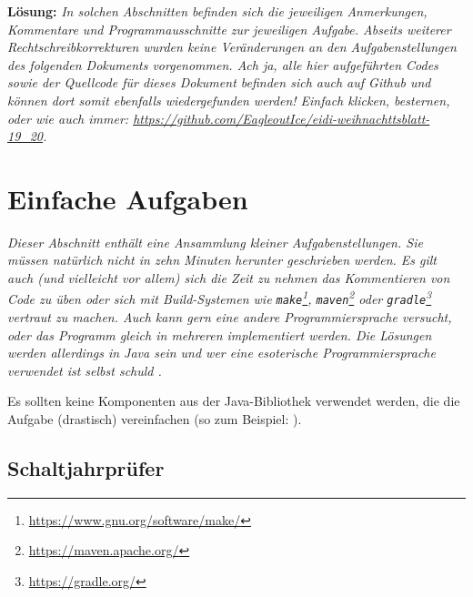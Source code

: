 \documentclass[table]{sopra-base}
\makeatletter
\let\T\texttt
\newenvironment{solution}{\null\par\noindent\textbf{\textcolor{sob@col@uulm@cs}{Lösung:}}\newline\bgroup\color{black}\slshape\ignorespaces}{\egroup}
\makeatother
\begin{document}
\begin{solution}
    In solchen Abschnitten befinden sich die jeweiligen Anmerkungen, Kommentare und Programmausschnitte zur jeweiligen Aufgabe. Abseits weiterer Rechtschreibkorrekturen wurden keine Veränderungen an den Aufgabenstellungen des folgenden Dokuments vorgenommen. Ach ja, alle hier aufgeführten Codes sowie der Quellcode für dieses Dokument befinden sich auch auf Github und können dort somit ebenfalls wiedergefunden werden! Einfach klicken, besternen, oder wie auch immer: \url{https://github.com/EagleoutIce/eidi-weihnachttsblatt-19_20}.
\end{solution}

%
%
%
%

\section{Einfache Aufgaben}

\textit{Dieser Abschnitt enthält eine Ansammlung kleiner Aufgabenstellungen. Sie müssen natürlich nicht in zehn Minuten herunter geschrieben werden. Es gilt auch (und vielleicht vor allem) sich die Zeit zu nehmen das
Kommentieren von Code zu üben oder sich mit Build-Systemen wie \T{make}\footnote{\url{https://www.gnu.org/software/make/}}, \T{maven}\footnote{\url{https://maven.apache.org/}} oder \T{gradle}\footnote{\url{https://gradle.org/}} vertraut zu machen. Auch kann gern eine andere Programmiersprache versucht, oder das Programm gleich in mehreren implementiert werden. Die Lösungen werden allerdings in Java sein und wer eine esoterische Programmiersprache verwendet ist selbst schuld \Winkey.}\par{}

Es sollten keine Komponenten aus der Java-Bibliothek verwendet werden, die die Aufgabe (drastisch) vereinfachen (so zum Beispiel: ).

\subsection{Schaltjahrprüfer}
\end{document}
